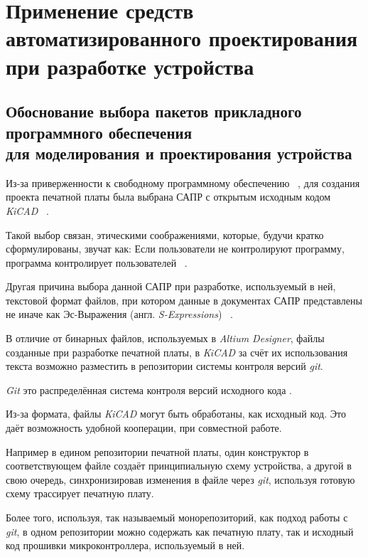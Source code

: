 \section{Применение средств автоматизированного проектирования \\
  при разработке устройства}

\subsection{Обоснование выбора пакетов прикладного программного обеспечения \\
  для моделирования и проектирования устройства}

Из-за приверженности к свободному программному обеспечению
~\cite{GNU-philosophy}, для создания проекта печатной платы была
выбрана САПР с открытым исходным кодом \textit{KiCAD}
~\cite{kicad-license}.

Такой выбор связан, этическими соображениями, которые, будучи
кратко сформулированы, звучат как:
Если пользователи не контролируют программу,
программа контролирует пользователей ~\cite{ufair-nonfree-programs}.

Другая причина выбора данной САПР при разработке,
используемый в ней, текстовой формат файлов,
при котором данные в документах САПР представлены
не иначе как Эс-Выражения (англ. \textit{S-Expressions})
~\cite{kicad-sexpr}.

В отличие от бинарных файлов,
используемых в \textit{Altium Designer},
файлы созданные при разработке печатной платы,
в \textit{KiCAD} за счёт их использования текста
возможно разместить в репозитории системы контроля версий
\textit{git}.

\textit{Git} это распределённая система контроля версий 
исходного кода \cite{git-dvcs}.

Из-за формата, файлы \textit{KiCAD} могут быть обработаны, как
исходный код.
Это даёт возможность удобной кооперации, при совместной работе.

Например в едином репозитории печатной платы, один конструктор в
соответствующем файле создаёт принципиальную схему устройства, а
другой в свою очередь, синхронизировав изменения в файле через
\textit{git}, используя готовую схему трассирует печатную плату.

Более того, используя, так называемый монорепозиторий, как подход
работы с \textit{git}, в одном репозитории можно содержать как
печатную плату, так и исходный код прошивки микроконтроллера,
используемый в ней.

